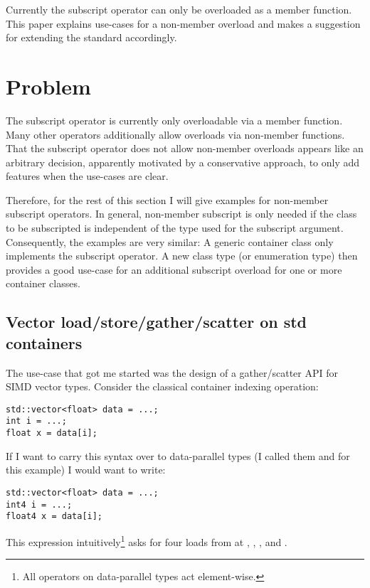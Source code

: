 \newcommand\wgTitle{Non-Member Subscript Operator}
\newcommand\wgName{Matthias Kretz <m.kretz@gsi.de>}
\newcommand\wgDocumentNumber{DXXXXR0}
\newcommand\wgGroup{EWG-I}
\newcommand\wgTarget{\CC{}23}

\usepackage{mymacros}
\usepackage{wg21}


\newlength\myIndent

\begin{wgTitlepage}
  Currently the subscript operator can only be overloaded as a member function.
  This paper explains use-cases for a non-member overload and makes a suggestion
  for extending the standard accordingly.
\end{wgTitlepage}

\section{Problem}
The subscript operator is currently only overloadable via a member function.
Many other operators additionally allow overloads via non\hyp member functions.
That the subscript operator does not allow non\hyp member overloads appears like an arbitrary decision, apparently motivated by a conservative approach, to only add features when the use\hyp cases are clear.

Therefore, for the rest of this section I will give examples for non\hyp member subscript operators.
In general, non\hyp member subscript is only needed if the class to be subscripted is independent of the type used for the subscript argument.
Consequently, the examples are very similar:
A generic container class only implements the  subscript operator.
A new class type (or enumeration type) then provides a good use\hyp case for an additional subscript overload for one or more container classes.

\subsection{Vector load/store/gather/scatter on std containers}
The use\hyp case that got me started was the design of a gather/scatter API for SIMD vector types.
Consider the classical container indexing operation:
\smallskip\begin{lstlisting}[style=Vc]
std::vector<float> data = ...;
int i = ...;
float x = data[i];
\end{lstlisting}
If I want to carry this syntax over to data\hyp parallel types (I called them  and  for this example) I would want to write:
\smallskip\begin{lstlisting}[style=Vc]
std::vector<float> data = ...;
int4 i = ...;
float4 x = data[i];
\end{lstlisting}
This expression intuitively\footnote{All operators on data-parallel types act element-wise.} asks for four loads from  at , , , and .

